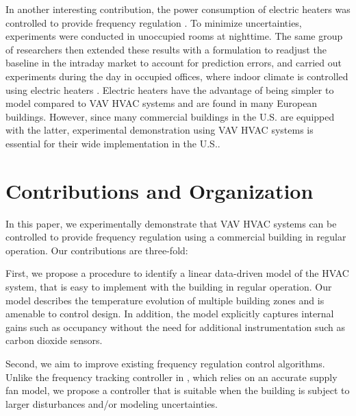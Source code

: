 \documentclass[../thesis.tex]{subfiles}
\begin{document}
In another interesting contribution, the power consumption of electric heaters was %
controlled to provide frequency regulation \cite{Fabietti:2016exp}. 
To minimize uncertainties, experiments were conducted in unoccupied rooms at nighttime.
The same group of researchers then extended these results with a formulation to readjust the baseline in the intraday market to account for prediction errors, and carried out experiments during the day in occupied offices, where indoor climate is controlled using electric heaters \cite{Gorecki:2017exp}.
Electric heaters have the advantage of being simpler to model compared to VAV HVAC systems and are found in many European buildings.
However, since many commercial buildings in the U.S. are equipped with the latter, experimental demonstration using VAV HVAC systems is essential for their wide implementation in the U.S..




\section{Contributions and Organization}

In this paper, we experimentally demonstrate that VAV HVAC systems can be controlled to provide frequency regulation using a commercial building in regular operation.
Our contributions are three-fold:

First, we propose a procedure to identify a linear data-driven model of the HVAC system, that is easy to implement with the building in regular operation. 
Our model describes the temperature evolution of multiple building zones and is amenable to control design.
In addition, the model explicitly captures internal gains such as occupancy without the need for additional instrumentation such as carbon dioxide sensors.

Second, we aim to improve existing frequency regulation control algorithms.
Unlike the frequency tracking controller in \cite{Vrettos:2016flexlab1}, which relies on an accurate supply fan model, we propose a controller that is suitable when the building is subject to larger disturbances and/or modeling uncertainties. 
\end{document}
